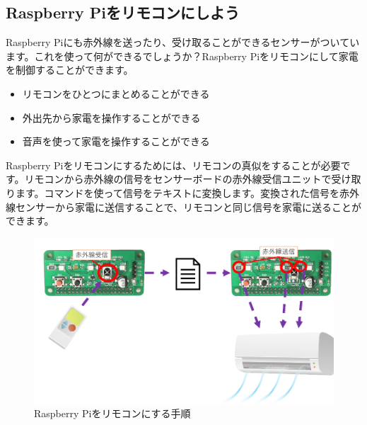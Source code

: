 \subsection{Raspberry Piをリモコンにしよう}

Raspberry Piにも赤外線を送ったり、受け取ることができるセンサーがついています。これを使って何ができるでしょうか？Raspberry Piをリモコンにして家電を制御することができます。

\begin{itemize}
\item リモコンをひとつにまとめることができる
\item 外出先から家電を操作することができる
\item 音声を使って家電を操作することができる
\end{itemize}

Raspberry Piをリモコンにするためには、リモコンの真似をすることが必要です。リモコンから赤外線の信号をセンサーボードの赤外線受信ユニットで受け取ります。コマンドを使って信号をテキストに変換します。変換された信号を赤外線センサーから家電に送信することで、リモコンと同じ信号を家電に送ることができます。

\begin{figure}[H]
    \centering
 \includegraphics[scale=0.4]{images/chap05/text05-img041.png}
    \caption{Raspberry Piをリモコンにする手順}
\end{figure}

